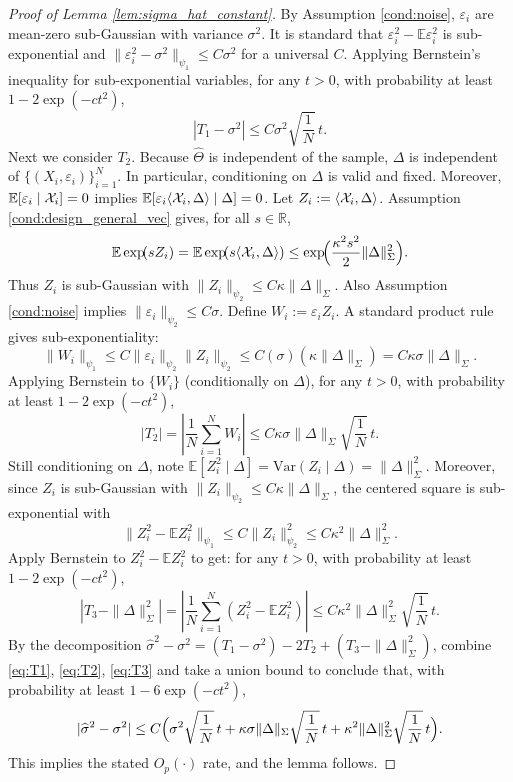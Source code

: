 \documentclass[authoryear,preprint,review,12pt]{elsarticle}
\begin{document}
{\begin{proof}[Proof of Lemma \ref{lem:sigma_hat_constant}]
		By Assumption \ref{cond:noise}, $\varepsilon_i$ are mean-zero sub-Gaussian with variance $\sigma^2$.
		It is standard that $\varepsilon_i^2-\mathbb E\varepsilon_i^2$ is sub-exponential and
		$\|\varepsilon_i^2-\sigma^2\|_{\psi_1}\le C\sigma^2$ for a universal $C$.
		Applying Bernstein's inequality for sub-exponential variables, for any $t>0$,
		with probability at least $1-2\exp(-ct^2)$,
		\begin{equation}\label{eq:T1}
			|T_1-\sigma^2|
			\le
			C\sigma^2\sqrt{\frac1N}\,t .
		\end{equation}
		Next we consider $T_2$. 
		Because $\widehat\Theta$ is independent of the sample, $\Delta$ is independent of
		$\{(X_i,\varepsilon_i)\}_{i=1}^N$. In particular, conditioning on $\Delta$ is valid and fixed.
		Moreover, $\mathbb E[\varepsilon_i\mid \mathcal{X}_i]=0$ implies
		$\mathbb E[\varepsilon_i\langle \mathcal{X}_i,\Delta\rangle\mid \Delta]=0$.
		Let $Z_i:=\langle \mathcal{X}_i,\Delta\rangle$.
		Assumption \ref{cond:design_general_vec} gives, for all $s\in\mathbb R$,
		\[
		\mathbb E\exp\!(s Z_i)
		=
		\mathbb E\exp\!(s\langle \mathcal{X}_i,\Delta\rangle)
		\le 
		\exp\!\Bigl(\frac{\kappa^2 s^2}{2}\|\Delta\|_\Sigma^2\Bigr).
		\]
		Thus $Z_i$ is sub-Gaussian with $\|Z_i\|_{\psi_2}\le C\kappa\|\Delta\|_\Sigma$.
		Also Assumption \ref{cond:noise} implies $\|\varepsilon_i\|_{\psi_2}\le C\sigma$. 
		Define $W_i:=\varepsilon_i Z_i$. A standard product rule gives sub-exponentiality:
		\[
		\|W_i\|_{\psi_1}
		\le
		C\|\varepsilon_i\|_{\psi_2}\|Z_i\|_{\psi_2}
		\le
		C(\sigma)(\kappa\|\Delta\|_\Sigma)
		=
		C\kappa\sigma\|\Delta\|_\Sigma.
		\]
		Applying Bernstein to $\{W_i\}$ (conditionally on $\Delta$), for any $t>0$, with probability
		at least $1-2\exp(-ct^2)$,
		\begin{equation}\label{eq:T2}
			|T_2|
			=
			\left|\frac1N\sum_{i=1}^N W_i\right|
			\le
			C\kappa\sigma\|\Delta\|_\Sigma\sqrt{\frac1N}\,t .
		\end{equation} 
		Still conditioning on $\Delta$, note $\mathbb E[Z_i^2\mid \Delta]=\mathrm{Var}(Z_i\mid\Delta)=\|\Delta\|_\Sigma^2$.
		Moreover, since $Z_i$ is sub-Gaussian with $\|Z_i\|_{\psi_2}\le C\kappa\|\Delta\|_\Sigma$,
		the centered square is sub-exponential with
		\[
		\|Z_i^2-\mathbb E Z_i^2\|_{\psi_1}
		\le
		C\|Z_i\|_{\psi_2}^2
		\le
		C\kappa^2\|\Delta\|_\Sigma^2.
		\]
		Apply Bernstein to $Z_i^2-\mathbb E Z_i^2$ to get: for any $t>0$, with probability at least
		$1-2\exp(-ct^2)$,
		\begin{equation}\label{eq:T3}
			\left|T_3-\|\Delta\|_\Sigma^2\right|
			=
			\left|\frac1N\sum_{i=1}^N (Z_i^2-\mathbb E Z_i^2)\right|
			\le
			C\kappa^2\|\Delta\|_\Sigma^2\sqrt{\frac1N}\,t .
		\end{equation} 
		By the decomposition $\widehat\sigma^2-\sigma^2=(T_1-\sigma^2)-2T_2+(T_3-\|\Delta\|_\Sigma^2)$,
		combine \eqref{eq:T1}, \eqref{eq:T2}, \eqref{eq:T3} and take a union bound
		to conclude that, with probability at least $1-6\exp(-ct^2)$,
		\[
		|\widehat\sigma^2-\sigma^2|
		\le
		C\Bigl(\sigma^2\sqrt{\frac1N}\,t
		+\kappa\sigma\|\Delta\|_\Sigma\sqrt{\frac1N}\,t
		+\kappa^2\|\Delta\|_\Sigma^2\sqrt{\frac1N}\,t\Bigr).
		\]
		This implies the stated $O_p(\cdot)$ rate, and the lemma follows.
	\end{proof}
}
\end{document}
